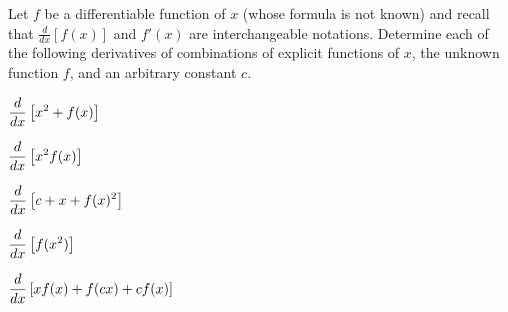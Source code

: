 \begin{pa} \label{PA:2.7}
Let $f$ be a differentiable function of $x$ (whose formula is not known) and recall that $\frac{d}{dx}[f(x)]$ and $f'(x)$ are interchangeable notations.  Determine each of the following derivatives of combinations of explicit functions of $x$, the unknown function $f$, and an arbitrary constant $c$.
\bmtwo
\ba
	\item $\displaystyle \frac{d}{dx} \left[ x^2 + f(x) \right]$
	\item $\displaystyle \frac{d}{dx} \left[ x^2 f(x) \right]$
	\item $\displaystyle \frac{d}{dx} \left[ c + x + f(x)^2 \right]$
	\item $\displaystyle \frac{d}{dx} \left[ f(x^2) \right]$
	\item $\displaystyle \frac{d}{dx} \left[ xf(x) + f(cx) + cf(x) \right]$
\ea
\emtwo
\end{pa} 
\afterpa